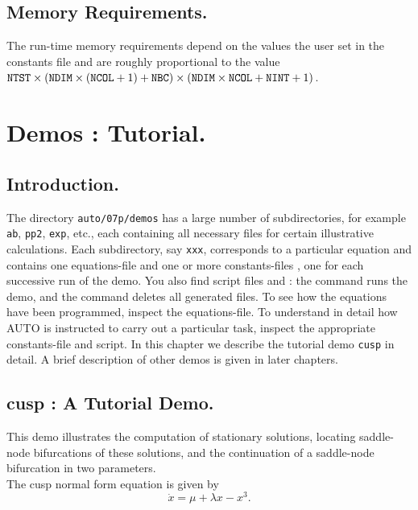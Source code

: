 \documentclass[12pt]{report}
\begin{document}
\section{ Memory Requirements.} \label{sec:Memory_requirements}
The run-time memory requirements depend on the values the user set in
the constants file and are roughly proportional to the value
${\tt NTST}\times({\tt NDIM}\times({\tt NCOL}+1)+{\tt NBC})\times
({\tt NDIM}\times{\tt NCOL}+{\tt NINT}+1)$.

\chapter{ \AUTO Demos : Tutorial.} \label{ch:Demos:_Tutorial}
\newpage
\section{ Introduction.} \label{sec:Tutorial_Introduction}
The directory {\tt auto/07p/demos} has a large number of subdirectories,
for example {\tt ab}, {\tt pp2}, {\tt exp}, etc.,
each containing all necessary files for certain illustrative calculations.
Each subdirectory, say {\tt xxx}, corresponds to a particular equation
and contains one equations-file 
and one or more constants-files , 
one for each successive run of the demo.
You also find \python script files  and
: the command  runs the demo,
and the command  deletes all generated files.
To see how the equations have been programmed, inspect the equations-file. 
To understand in detail how {\cal AUTO} is instructed to carry out a 
particular task, inspect the appropriate constants-file and \python
script.
In this chapter we describe the tutorial demo {\tt cusp} in detail.
A brief description of other demos is given in later chapters.


\section{ cusp : A Tutorial Demo.} \label{sec:Demos_cusp}
This demo illustrates the computation of 
stationary solutions, locating saddle-node bifurcations of these
solutions, and the continuation of a saddle-node bifurcation in two
parameters.\\
The cusp normal form equation is given by
\begin{equation}
  \dot x = \mu + \lambda x - x^3.
\end{equation}
\end{document}

